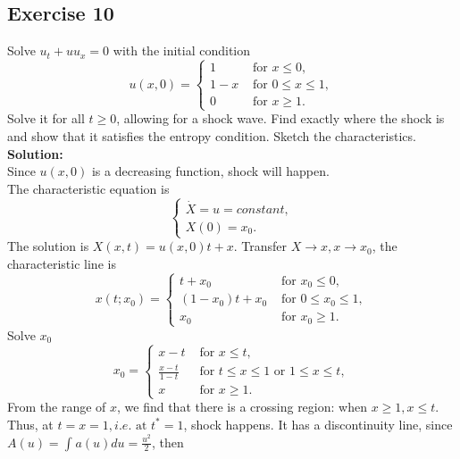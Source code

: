 \documentclass[12pt]{article}%
\begin{document}
\subsection*{Exercise 10}
Solve $u_{t}+uu_{x}=0$ with the initial condition 
\begin{equation*}u(x,0)=
    \begin{cases}
        1 & \text{ for } x \le 0,\\
        1-x & \text{ for } 0\le x\le 1,\\
        0 & \text{ for }  x\ge 1.
    \end{cases}
\end{equation*}
Solve it for all $t\ge0$, allowing for a shock wave.
Find exactly where the shock is and show that it satisfies the entropy condition.
Sketch the characteristics.\\
\textbf{Solution:}\\
Since $u(x,0)$ is a decreasing function, shock will happen.\\
The characteristic equation is 
\begin{equation*}
    \begin{cases}
        \dot{X}=u=constant, \\
        X(0)=x_{0}.
    \end{cases}   
\end{equation*}
The solution is $X(x,t)=u(x,0)t+x$. Transfer $X\to x, x\to x_{0}$, the characteristic line is 
\begin{equation*}x(t;x_{0})=
    \begin{cases}
        t+x_{0} & \text{ for } x_{0} \le 0,\\
        (1-x_{0})t+x_{0} & \text{ for } 0\le x_{0}\le 1,\\
        x_{0} & \text{ for }  x_{0}\ge 1.
    \end{cases}
\end{equation*}
Solve $x_{0}$
\begin{equation*}x_{0}=
    \begin{cases}
        x-t & \text{ for } x \le t,\\
        \frac{x-t}{1-t} & \text{ for } t \le x \le 1  \text{ or } 1 \le x \le t, \\
        x & \text{ for }  x\ge 1.
    \end{cases}
\end{equation*}
From the range of $x$, we find that there is a crossing region: when $x\ge 1, x\le t$.\\
Thus, at  $t=x=1, i.e. \text{ at } t^{*}=1$, shock happens. It has a discontinuity line, since $A(u)=\int_{}^{}a(u)du=\frac{u^2}{2}$, then
\end{document}
